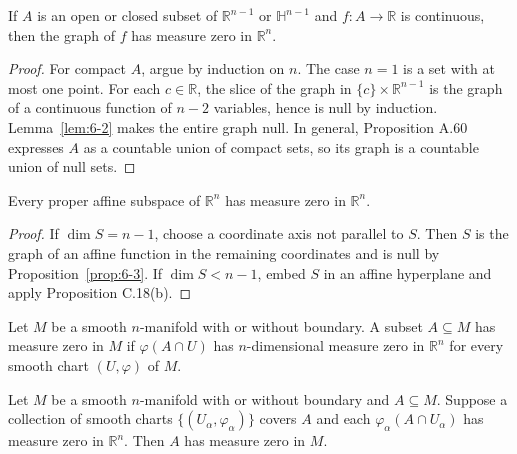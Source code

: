 \begin{proposition}
\label{prop:6-3}
\leanok
{}
If $A$ is an open or closed subset of $\mathbb{R}^{n-1}$ or $\mathbb{H}^{n-1}$ and $f:A\to\mathbb{R}$ is continuous, then the graph of $f$ has measure zero in $\mathbb{R}^n$.
\end{proposition}

\begin{proof}
\leanok
\sketch For compact $A$, argue by induction on $n$. The case $n=1$ is a set with at most one point. For each $c\in\mathbb{R}$, the slice of the graph in $\{c\}\times\mathbb{R}^{n-1}$ is the graph of a continuous function of $n-2$ variables, hence is null by induction. Lemma~\ref{lem:6-2} makes the entire graph null. In general, Proposition A.60 expresses $A$ as a countable union of compact sets, so its graph is a countable union of null sets.
\end{proof}

\begin{corollary}
\label{cor:6-4}
\leanok
{}
Every proper affine subspace of $\mathbb{R}^n$ has measure zero in $\mathbb{R}^n$.
\end{corollary}

\begin{proof}
\leanok
\sketch If $\dim S=n-1$, choose a coordinate axis not parallel to $S$. Then $S$ is the graph of an affine function in the remaining coordinates and is null by Proposition~\ref{prop:6-3}. If $\dim S<n-1$, embed $S$ in an affine hyperplane and apply Proposition C.18(b).
\end{proof}

\begin{definition}
\label{def:6-38-extra-2}
\leanok
Let $M$ be a smooth $n$-manifold with or without boundary. A subset $A\subseteq M$ has measure zero in $M$ if $\varphi(A\cap U)$ has $n$-dimensional measure zero in $\mathbb{R}^n$ for every smooth chart $(U,\varphi)$ of $M$.
\end{definition}

\begin{lemma}
\label{lem:6-6}
\leanok
{}
Let $M$ be a smooth $n$-manifold with or without boundary and $A\subseteq M$. Suppose a collection of smooth charts $\{(U_\alpha,\varphi_\alpha)\}$ covers $A$ and each $\varphi_\alpha(A\cap U_\alpha)$ has measure zero in $\mathbb{R}^n$. Then $A$ has measure zero in $M$.
\end{lemma}

